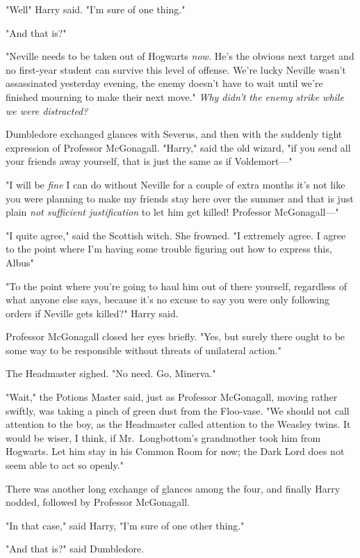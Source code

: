"Well{\el}" Harry said. "I'm sure of one thing."

"And that is?"

"Neville needs to be taken out of Hogwarts \emph{now.} He's the obvious next
target and no first-year student can survive this level of offense. We're lucky
Neville wasn't assassinated yesterday evening, the enemy doesn't have to wait
until we're finished mourning to make their next move." \emph{Why didn't the
enemy strike while we were distracted?}

Dumbledore exchanged glances with Severus, and then with the suddenly tight
expression of Professor McGonagall. "Harry," said the old wizard, "if you send
all your friends away yourself, that is just the same as if Voldemort\mbox{---}"

"I will be \emph{fine} I can do without Neville for a couple of extra months
it's not like you were planning to make my friends stay here over the summer
and that is just plain \emph{not sufficient justification} to let him get
killed! Professor McGonagall\mbox{---}"

"I quite agree," said the Scottish witch. She frowned. "I extremely agree. I
agree to the point where{\el} I'm having some trouble figuring out how to
express this, Albus{\el}"

"To the point where you're going to haul him out of there yourself, regardless
of what anyone else says, because it's no excuse to say you were only following
orders if Neville gets killed?" Harry said.

Professor McGonagall closed her eyes briefly. "Yes, but surely there ought to
be some way to be responsible without threats of unilateral action."

The Headmaster sighed. "No need. Go, Minerva."

"Wait," the Potions Master said, just as Professor McGonagall, moving rather
swiftly, was taking a pinch of green dust from the Floo-vase. "We should not
call attention to the boy, as the Headmaster called attention to the Weasley
twins. It would be wiser, I think, if Mr.~Longbottom's grandmother took him
from Hogwarts. Let him stay in his Common Room for now; the Dark Lord does not
seem able to act so openly."

There was another long exchange of glances among the four, and finally Harry
nodded, followed by Professor McGonagall.

"In that case," said Harry, "I'm sure of one other thing."

"And that is?" said Dumbledore.


